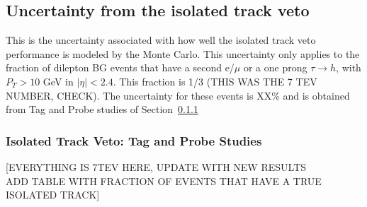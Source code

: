 
\subsection{Uncertainty from the isolated track veto}
This is the uncertainty associated with how well the isolated track
veto performance is modeled by the Monte Carlo.  This uncertainty
only applies to the fraction of dilepton BG events that have 
a second e/$\mu$ or a one prong $\tau \to h$, with 
$P_T > 10$ GeV in $|\eta| < 2.4$.  This fraction is 1/3 (THIS WAS THE
7 TEV NUMBER, CHECK).  The uncertainty for these events
is XX\% and is obtained from Tag and Probe studies of Section~\ref{sec:trkveto}

\subsubsection{Isolated Track Veto: Tag and Probe Studies}
\label{sec:trkveto}

[EVERYTHING IS 7TEV HERE, UPDATE WITH NEW RESULTS \\
ADD TABLE WITH FRACTION OF EVENTS THAT HAVE A TRUE ISOLATED TRACK]

